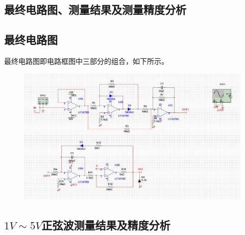 \documentclass[12pt,a4paper]{article}
\begin{document}
\begin{spacing}{1.3}
\section{最终电路图、测量结果及测量精度分析}
\subsection{最终电路图}
最终电路图即电路框图中三部分的组合，如下所示。
\begin{figure}[H]
\centering
\includegraphics[width=\textwidth]{3.jpg}
\end{figure}
\subsection{$1V\sim 5V$正弦波测量结果及精度分析}

\end{spacing}
\end{document}

